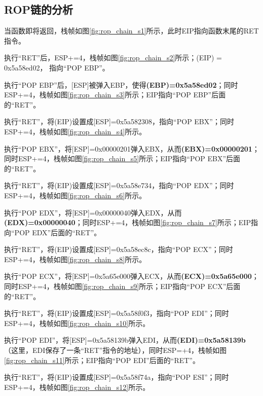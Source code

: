 \documentclass[bachelor]{thesis-uestc}
\begin{document}
\subsection{ROP链的分析}
当函数即将返回，栈帧如图\ref{fig:rop_chain_s1}所示，此时EIP指向函数末尾的RET指令。\par

执行``RET''后，ESP+=4，栈帧如图\ref{fig:rop_chain_s2}所示；(EIP) = 0x5a58ed02， 指向``POP EBP''。\par

执行``POP EBP''后，[ESP]被弹入EBP，使得\textbf{(EBP)=0x5a58ed02}；同时ESP+=4，栈帧如图\ref{fig:rop_chain_s3}所示；EIP指向``POP EBP''后面的``RET''。\par

执行``RET''，将(EIP)设置成[ESP]=0x5a582308，指向``POP EBX''；同时ESP+=4，栈帧如图\ref{fig:rop_chain_s4}所示。\par

执行``POP EBX''，将[ESP]=0x00000201弹入EBX，从而\textbf{(EBX)=0x00000201}；同时ESP+=4，栈帧如图\ref{fig:rop_chain_s5}所示；EIP指向``POP EBX''后面的``RET''。\par

执行``RET''，将(EIP)设置成[ESP]=0x5a58e734，指向``POP EDX''；同时ESP+=4，栈帧如图\ref{fig:rop_chain_s6}所示。\par

执行``POP EDX''，将[ESP]=0x00000040弹入EDX，从而\textbf{(EDX)=0x00000040}；同时ESP+=4，栈帧如图\ref{fig:rop_chain_s7}所示；EIP指向``POP EDX''后面的``RET''。\par

执行``RET''，将(EIP)设置成[ESP]=0x5a58ec8c，指向``POP ECX''；同时ESP+=4，栈帧如图\ref{fig:rop_chain_s8}所示。\par

执行``POP ECX''，将[ESP]=0x5a65e000弹入ECX，从而\textbf{(ECX)=0x5a65e000}；同时ESP+=4，栈帧如图\ref{fig:rop_chain_s9}所示；EIP指向``POP ECX''后面的``RET''。\par

执行``RET''，将(EIP)设置成[ESP]=0x5a58f0f3，指向``POP EDI''；同时ESP+=4，栈帧如图\ref{fig:rop_chain_s10}所示。\par

执行``POP EDI''，将[ESP]=0x5a58139b弹入EDI，从而\textbf{(EDI)=0x5a58139b}（这里，EDI保存了一条``RET''指令的地址），同时ESP=+4，栈帧如图\ref{fig:rop_chain_s11}所示；EIP指向``POP EDI''后面的``RET''。\par

执行``RET''，将(EIP)设置成[ESP]=0x5a58f74a，指向``POP ESI''；同时ESP+=4，栈帧如图\ref{fig:rop_chain_s12}所示。\par
\end{document}
